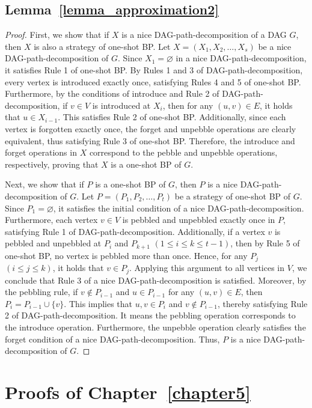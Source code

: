 \documentclass[runningheads]{llncs}
\theoremstyle{plain}
\theoremstyle{definition}
\begin{document}
\subsection{\textbf{Lemma~\ref{lemma_approximation2}}}
\begin{proof}
    First, we show that if $X$ is a nice DAG-path-decomposition of a DAG $G$, then $X$ is also a strategy of one-shot BP. Let $X=(X_1, X_2, \dots, X_s)$ be a nice DAG-path-decomposition of $G$. Since $X_1 = \varnothing$ in a nice DAG-path-decomposition, it satisfies Rule 1 of one-shot BP. By Rules 1 and 3 of DAG-path-decomposition, every vertex is introduced exactly once, satisfying Rules 4 and 5 of one-shot BP. Furthermore, by the conditions of introduce and Rule 2 of DAG-path-decomposition, if $v \in V$ is introduced at $X_i$, then for any $(u, v) \in E$, it holds that $u \in X_{i-1}$. This satisfies Rule 2 of one-shot BP. Additionally, since each vertex is forgotten exactly once, the forget and unpebble operations are clearly equivalent, thus satisfying Rule 3 of one-shot BP. Therefore, the introduce and forget operations in $X$ correspond to the pebble and unpebble operations, respectively, proving that $X$ is a one-shot BP of $G$.

    Next, we show that if $P$ is a one-shot BP of $G$, then $P$ is a nice DAG-path-decomposition of $G$. Let $P=(P_1, P_2, \dots, P_t)$ be a strategy of one-shot BP of $G$. Since $P_1 = \varnothing$, it satisfies the initial condition of a nice DAG-path-decomposition. Furthermore, each vertex $v \in V$ is pebbled and unpebbled exactly once in $P$, satisfying Rule 1 of DAG-path-decomposition. Additionally, if a vertex $v$ is pebbled and unpebbled at $P_i$ and $P_{k+1}$ $(1 \leq i \leq k \leq t-1)$, then by Rule 5 of one-shot BP, no vertex is pebbled more than once. Hence, for any $P_j$ $(i \leq j \leq k)$, it holds that $v \in P_j$. Applying this argument to all vertices in $V$, we conclude that Rule 3 of a nice DAG-path-decomposition is satisfied. Moreover, by the pebbling rule, if $v \notin P_{i-1}$ and $u \in P_{i-1}$ for any $(u, v) \in E$, then $P_i = P_{i-1} \cup \{v\}$. This implies that $u, v \in P_i$ and $v \notin P_{i-1}$, thereby satisfying Rule 2 of DAG-path-decomposition. It means the pebbling operation corresponds to the introduce operation. Furthermore, the unpebble operation clearly satisfies the forget condition of a nice DAG-path-decomposition. Thus, $P$ is a nice DAG-path-decomposition of $G$.
\end{proof}


\section{Proofs of Chapter~\ref{chapter5}}
\end{document}
